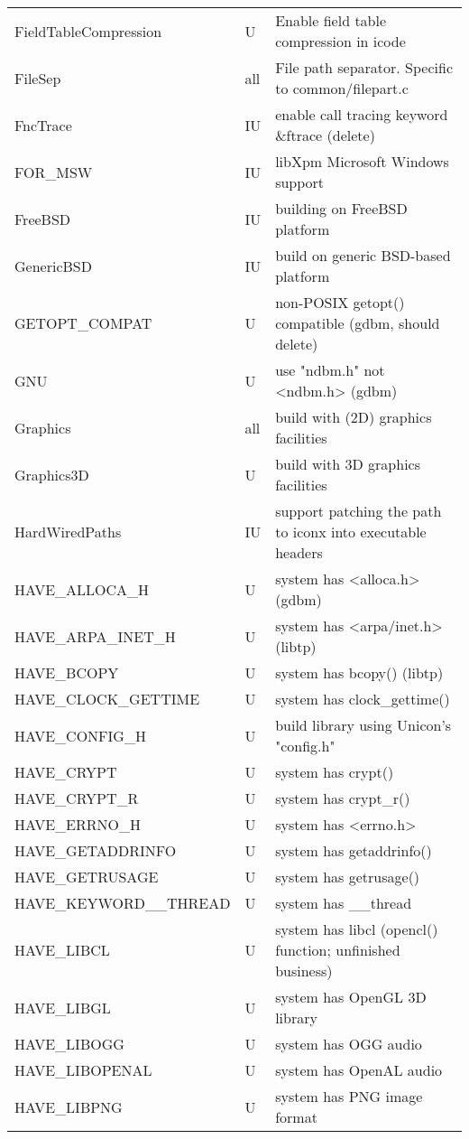 \begin{xtabular}{|m{1.8in}|m{0.5in}|m{4.0in}|}
FieldTableCompression & U & Enable field table compression in icode \\
FileSep & all & File path separator. Specific to common/filepart.c \\
FncTrace & IU & enable call tracing keyword \&ftrace (delete) \\
FOR\_MSW & IU & libXpm Microsoft Windows support \\
FreeBSD & IU & building on FreeBSD platform \\
GenericBSD & IU & build on generic BSD-based platform \\
GETOPT\_COMPAT & U & non-POSIX getopt() compatible (gdbm, should delete) \\
GNU & U & use "ndbm.h" not <ndbm.h> (gdbm) \\
Graphics & all & build with (2D) graphics facilities \\
Graphics3D & U & build with 3D graphics facilities \\
HardWiredPaths & IU & support patching the path to iconx into executable headers \\
HAVE\_ALLOCA\_H & U & system has <alloca.h> (gdbm) \\
HAVE\_ARPA\_INET\_H & U & system has <arpa/inet.h> (libtp) \\
HAVE\_BCOPY & U & system has bcopy() (libtp) \\
HAVE\_CLOCK\_GETTIME & U & system has clock\_gettime() \\
HAVE\_CONFIG\_H & U & build library using Unicon's "config.h" \\
HAVE\_CRYPT & U & system has crypt() \\
HAVE\_CRYPT\_R & U & system has crypt\_r() \\
HAVE\_ERRNO\_H & U & system has <errno.h> \\
HAVE\_GETADDRINFO & U & system has getaddrinfo() \\
HAVE\_GETRUSAGE & U & system has getrusage() \\
HAVE\_KEYWORD\_\_THREAD & U & system has \_\_thread \\
HAVE\_LIBCL & U & system has libcl (opencl() function; unfinished business) \\
HAVE\_LIBGL & U & system has OpenGL 3D library \\
HAVE\_LIBOGG & U & system has OGG audio \\
HAVE\_LIBOPENAL & U & system has OpenAL audio \\
HAVE\_LIBPNG & U & system has PNG image format \\

\end{xtabular}
